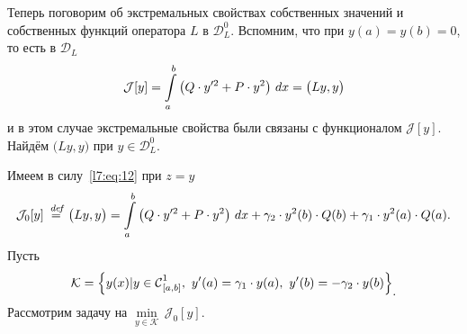 \documentclass[12pt,a4paper,openany,fleqn]{book}
\newcommand {\defeq}{\stackrel{\hspace{0.09 cm}de\!f}{=}}
\newcommand {\eqdef}{\defeq}
\newcommand{\Cf}{\ensuremath{\mathcal{C}}}
\newcommand{\J}{\ensuremath{\mathcal{J}}}
\newcommand{\mc}[1]{\ensuremath{\mathcal{#1}}}
\newcommand{\Cfn}[2][]{\ensuremath{\Cf{\mathstrut}^{#2}_{#1}}}
\newcommand{\K}{\mc{K}}
\theoremstyle{definition}
\begin{document}
	Теперь поговорим об экстремальных свойствах собственных значений и собственных функций оператора $L$ в $\mc{D}_L^0$. Вспомним, что при $y(a)=y(b)=0$, то есть в $\mc{D}_L$ 
	\begin{equation*}
		\hfill\J[y]=\int\limits_a^b\left(Q\cdot y^{\prime2}+P\cdot y^2\right)\,dx=\big(Ly,y\big)\hfill
	\end{equation*} 
	и в этом случае экстремальные свойства были связаны с функционалом $\J[y]$. Найдём $\big(Ly,y\big)$ при $y\in\mc{D}_L^0$.
	
	Имеем в силу~\eqref{l7:eq:12} при $z=y$
	\begin{equation}
		\label{l7:eq:13}
		\hfill\J_0[y]\eqdef\big(Ly,y\big)=\int\limits_a^b\left(Q\cdot y^{\prime2}+P\cdot y^2\right)\,dx+\gamma_2\cdot y^2(b)\cdot Q(b)+\gamma_1\cdot y^2(a)\cdot Q(a).\hfill
	\end{equation} 
	Пусть
	\begin{equation*}
		\hfill\K=\left\{y(x)|y\in\Cfn[{[a,b]}]{1},\ y'(a)=\gamma_1\cdot y(a),\ y'(b)=-\gamma_2\cdot y(b) \right\}_{\displaystyle.}\hfill
	\end{equation*}
	Рассмотрим задачу на $\displaystyle\min\limits_{y\in\K}\,\J_0[y]$. 
	
\end{document}
